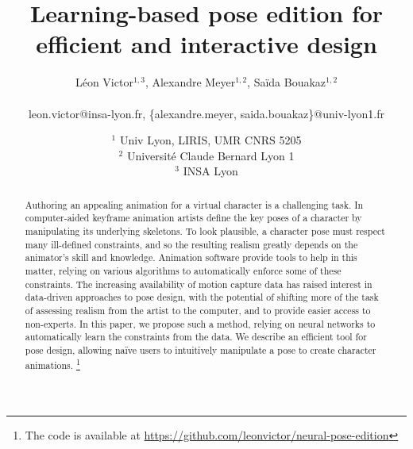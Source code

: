 \documentclass[11pt,twocolumn]{scrartcl}
\title{Learning-based pose edition for efficient and interactive design}
\author{Léon Victor$^{1,3}$, 
        Alexandre Meyer$^{1,2}$, 
        Saïda Bouakaz$^{1,2}$
        
        \\
        leon.victor@insa-lyon.fr, \{alexandre.meyer, saida.bouakaz\}@univ-lyon1.fr
       }
\date{%
    $^1$ Univ Lyon, LIRIS, UMR CNRS 5205\\%
    $^2$ Université Claude Bernard Lyon 1\\%
    $^3$ INSA Lyon\\%
    \vspace{5pt}
}
\begin{document}
\makeatletter
\let\@oldmaketitle\@maketitle%
\renewcommand{\@maketitle}{\@oldmaketitle%
  \vspace{-10mm}
  \centering
  \texttt{[image: teaser-casa.png]}
  \captionof{figure}{Sample results of our method in various configuration. Our method is able to generate plausible poses given a starting pose (on the left) and some targets (in red), respecting skeleton constraints without having to explicitly specify them.}
    \bigskip}%
\makeatother
\vspace{-5pt}
\maketitle
\vspace{4pt}
\begin{abstract}
Authoring an appealing animation for a virtual character is a challenging task. In computer-aided keyframe animation artists define the key poses of a character by manipulating its underlying skeletons.
To look plausible, a character pose must respect many ill-defined constraints, and so the resulting realism greatly depends on the animator's skill and knowledge.
Animation software provide tools to help in this matter, relying on various algorithms to automatically enforce some of these constraints.
The increasing availability of motion capture data has raised interest in data-driven approaches to pose design, with the potential of shifting more of the task of assessing realism from the artist to the computer, and to provide easier access to non-experts. In this paper, we propose such a method, relying on neural networks to automatically learn the constraints from the data. We describe an efficient tool for pose design, allowing naïve users to intuitively manipulate a pose to create character animations.
\footnote{The code is available at \url{https://github.com/leonvictor/neural-pose-edition}}
\linebreak
\linebreak
{}
\end{abstract}
\end{document}
